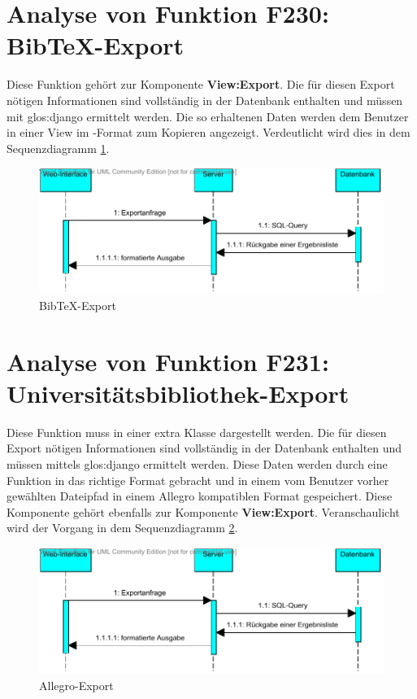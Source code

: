 \section{Analyse von Funktion F230: Bib\TeX -Export}
Diese Funktion gehört zur Komponente \textbf{View:Export}. Die für diesen Export nötigen Informationen sind vollständig in der Datenbank enthalten und müssen mit \gls{glos:django} ermittelt werden. Die so erhaltenen Daten werden dem Benutzer in einer View im \BibTeX -Format zum Kopieren angezeigt. Verdeutlicht wird dies in dem Sequenzdiagramm \ref{fig:BibTeX-Export}.

\begin{figure}[h]
\includegraphics[width=0.8\linewidth]{bilder/Seq-BibTex.pdf}
\caption[BibTeX-Export]{BibTeX-Export}
\label{fig:BibTeX-Export}
\end{figure}

\section{Analyse von Funktion F231: Universitätsbibliothek-Export}

Diese Funktion muss in einer extra Klasse dargestellt werden. Die für diesen
Export nötigen Informationen sind vollständig in der Datenbank enthalten und
müssen mittels \gls{glos:django} ermittelt werden. Diese Daten
werden durch eine Funktion in das richtige Format gebracht und in einem vom
Benutzer vorher gewählten Dateipfad in einem Allegro kompatiblen Format
gespeichert. Diese Komponente gehört ebenfalls zur Komponente
\textbf{View:Export}. Veranschaulicht wird der Vorgang in dem Sequenzdiagramm
\ref{fig:Allegro-Export}.

\begin{figure}[h]
\includegraphics[width=0.8\linewidth]{bilder/Seq-BibTex.pdf}
\caption[Allegro-Export]{Allegro-Export}
\label{fig:Allegro-Export}
\end{figure}

